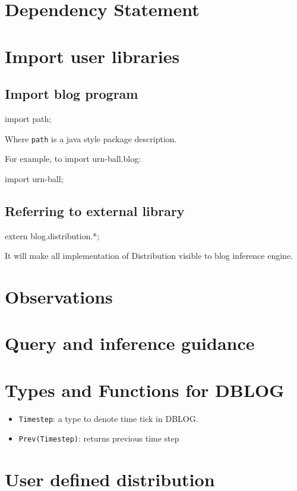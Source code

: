 \documentclass[12pt]{article}
\begin{document}
\section{Dependency Statement}


\section{Import user libraries}
\subsection{Import blog program}
\begin{blog}
import path;
\end{blog}
Where \texttt{path} is a java style package description.

For example, to import urn-ball.blog:
\begin{blog}
import urn-ball;
\end{blog}

\subsection{Referring to external library}
\begin{blog}
extern blog.distribution.*;
\end{blog}
It will make all implementation of Distribution visible to blog inference engine.

\section{Observations}



\section{Query and inference guidance}

\section{Types and Functions for DBLOG}

\begin{itemize}
\item {\tt Timestep}: a type to denote time tick in DBLOG.
\item {\tt Prev(Timestep)}: returns previous time step
\end{itemize}


\section{User defined distribution}
\end{document}
